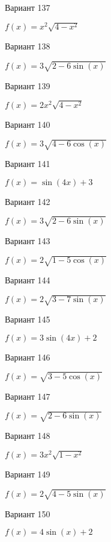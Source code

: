 \documentclass[11pt]{report}
\begin{document}
Вариант 137

$f(x) = x^{2} \sqrt{4 - x^{2}}$

Вариант 138

$f(x) = 3 \sqrt{2 - 6 \sin{\left(x \right)}}$

Вариант 139

$f(x) = 2 x^{2} \sqrt{4 - x^{2}}$

Вариант 140

$f(x) = 3 \sqrt{4 - 6 \cos{\left(x \right)}}$

Вариант 141

$f(x) = \sin{\left(4 x \right)} + 3$

Вариант 142

$f(x) = 3 \sqrt{2 - 6 \sin{\left(x \right)}}$

Вариант 143

$f(x) = 2 \sqrt{1 - 5 \cos{\left(x \right)}}$

Вариант 144

$f(x) = 2 \sqrt{3 - 7 \sin{\left(x \right)}}$

Вариант 145

$f(x) = 3 \sin{\left(4 x \right)} + 2$

Вариант 146

$f(x) = \sqrt{3 - 5 \cos{\left(x \right)}}$

Вариант 147

$f(x) = \sqrt{2 - 6 \sin{\left(x \right)}}$

Вариант 148

$f(x) = 3 x^{2} \sqrt{1 - x^{2}}$

Вариант 149

$f(x) = 2 \sqrt{4 - 5 \sin{\left(x \right)}}$

Вариант 150

$f(x) = 4 \sin{\left(x \right)} + 2$
\end{document}
